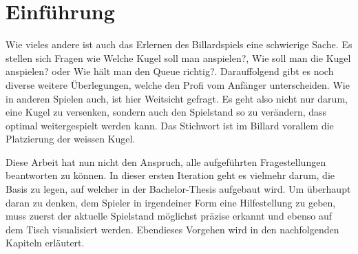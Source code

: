 \chapter{Einführung}
Wie vieles andere ist auch das Erlernen des Billardspiels eine schwierige Sache. Es stellen sich Fragen wie \glqq Welche
Kugel soll man anspielen?\grqq{}, \glqq Wie soll man die Kugel anspielen?\grqq{} oder \glqq Wie hält man den Queue richtig?\grqq{}.
Darauffolgend gibt es noch diverse weitere Überlegungen, welche den Profi vom Anfänger unterscheiden. Wie in anderen Spielen
auch, ist hier Weitsicht gefragt. Es geht also nicht nur darum, eine Kugel zu versenken, sondern auch den Spielstand so zu
verändern, dass optimal weitergespielt werden kann. Das Stichwort ist im Billard vorallem die Platzierung der weissen Kugel.

Diese Arbeit hat nun nicht den Anspruch, alle aufgeführten Fragestellungen beantworten zu können. In dieser ersten Iteration
geht es vielmehr darum, die Basis zu legen, auf welcher in der Bachelor-Thesis aufgebaut wird. Um überhaupt daran zu denken,
dem Spieler in irgendeiner Form eine Hilfestellung zu geben, muss zuerst der aktuelle Spielstand möglichst präzise
erkannt und ebenso auf dem Tisch visualisiert werden. Ebendieses Vorgehen wird in den nachfolgenden Kapiteln erläutert.